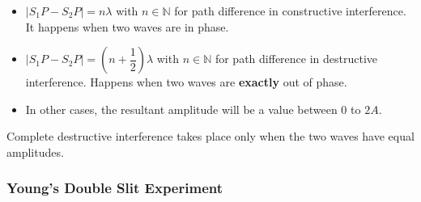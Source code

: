 \documentclass[a4paper,12pt]{article}
\begin{document}
\begin{itemize}
  \item $|S_1P-S_2P|=n\lambda$ with $n\in\mathbb{N}$ for path difference in constructive interference. It happens when two waves are in phase.
  \item $|S_1P-S_2P|=\left(n+\dfrac{1}{2}\right)\lambda$ with $n\in\mathbb{N}$ for path difference in destructive interference. Happens when two waves are \textbf{exactly} out of phase.
  \item In other cases, the resultant amplitude will be a value between 0 to $2A$.
\end{itemize}
Complete destructive interference takes place only when the two waves have equal amplitudes.
\subsubsection*{Young's Double Slit Experiment}
\end{document}
